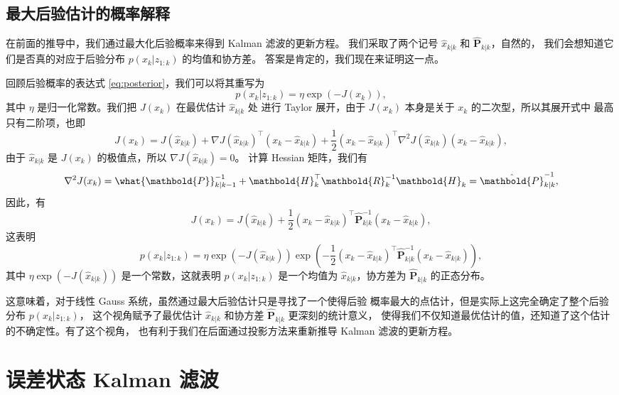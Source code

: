 \documentclass[fontset=none,zihao=-4]{Notes}
\newcommand{\mat}[1]{\mathbold{#1}}
\begin{document}
\subsection{最大后验估计的概率解释}\label{subsec:map_prob}

在前面的推导中，我们通过最大化后验概率来得到 Kalman 滤波的更新方程。
我们采取了两个记号 $\hat x_{k|k}$ 和 $\hat{\mat P}_{k|k}$，自然的，
我们会想知道它们是否真的对应于后验分布 $p(x_k|z_{1:k})$ 的均值和协方差。
答案是肯定的，我们现在来证明这一点。

回顾后验概率的表达式 \eqref{eq:posterior}，我们可以将其重写为
\[
  p(x_k|z_{1:k})=\eta\exp(-J(x_k)),
\]
其中 $\eta$ 是归一化常数。我们把 $J(x_k)$ 在最优估计 $\hat x_{k|k}$ 处
进行 Taylor 展开，由于 $J(x_k)$ 本身是关于 $x_k$ 的二次型，所以其展开式中
最高只有二阶项，也即
\[
  J(x_k)=J(\hat x_{k|k})+\nabla J(\hat x_{k|k})^\top (x_k-\hat x_{k|k})+\frac{1}{2}(x_k-\hat x_{k|k})^\top \nabla^2 J(\hat x_{k|k})(x_k-\hat x_{k|k}),
\]
由于 $\hat x_{k|k}$ 是 $J(x_k)$ 的极值点，所以 $\nabla J(\hat x_{k|k})=0$。
计算 Hessian 矩阵，我们有
\[
  \nabla^2 J(x_k)=\what{\mat P}_{k|k-1}^{-1}+\mat H_k^\top\mat R_k^{-1}\mat H_k
  =\hat{\mat P}_{k|k}^{-1},
\]
因此，有
\[
  J(x_k)=J(\hat x_{k|k})+\frac{1}{2}(x_k-\hat x_{k|k})^\top \hat{\mat P}_{k|k}^{-1}(x_k-\hat x_{k|k}),
\]
这表明
\[
  p(x_k|z_{1:k})=\eta \exp(-J(\hat x_{k|k})) \exp\left(
    -\frac{1}{2}(x_k-\hat x_{k|k})^\top \hat{\mat P}_{k|k}^{-1}(x_k-\hat x_{k|k})
  \right),
\]
其中 $\eta \exp(-J(\hat x_{k|k}))$ 是一个常数，这就表明 $p(x_k|z_{1:k})$ 是一个均值为 $\hat x_{k|k}$，协方差为 $\hat{\mat P}_{k|k}$ 的正态分布。

这意味着，对于线性 Gauss 系统，虽然通过最大后验估计只是寻找了一个使得后验
概率最大的点估计，但是实际上这完全确定了整个后验分布 $p(x_k|z_{1:k})$，
这个视角赋予了最优估计 $\hat x_{k|k}$ 和协方差 $\hat{\mat P}_{k|k}$ 更深刻的统计意义，
使得我们不仅知道最优估计的值，还知道了这个估计的不确定性。有了这个视角，
也有利于我们在后面通过投影方法来重新推导 Kalman 滤波的更新方程。

\section{误差状态 Kalman 滤波}
\end{document}
